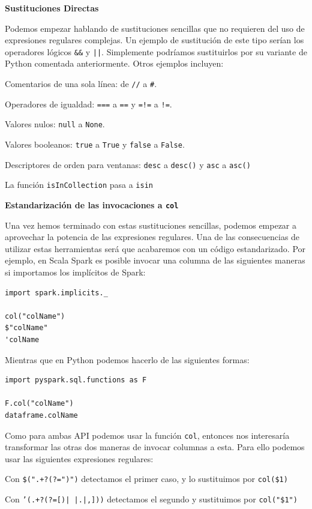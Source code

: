 \documentclass[12pt,twoside,titlepage]{report}
\begin{document}
\textbf{Sustituciones Directas}

Podemos empezar hablando de sustituciones sencillas que no requieren del uso de expresiones regulares complejas. Un ejemplo de sustitución de este tipo serían los operadores lógicos \texttt{\&\&} y \texttt{||}. Simplemente podríamos sustituirlos por su variante de Python comentada anteriormente. Otros ejemplos incluyen:

\begin{compactitem}
	\item Comentarios de una sola línea: de \texttt{//} a \texttt{\#}.
	\item Operadores de igualdad: \texttt{===} a \texttt{==} y \texttt{=!=} a \texttt{!=}.
	\item Valores nulos: \texttt{null} a \texttt{None}.
	\item Valores booleanos: \texttt{true} a \texttt{True} y \texttt{false} a \texttt{False}.
	\item Descriptores de orden para ventanas: \texttt{desc} a \texttt{desc()} y \texttt{asc} a \texttt{asc()}
	\item La función \texttt{isInCollection} pasa a \texttt{isin}
\end{compactitem}


\textbf{Estandarización de las invocaciones a \texttt{col}}

Una vez hemos terminado con estas sustituciones sencillas, podemos empezar a aprovechar la potencia de las expresiones regulares. Una de las consecuencias de utilizar estas herramientas será que acabaremos con un código estandarizado. Por ejemplo, en Scala Spark es posible invocar una columna de las siguientes maneras si importamos los implícitos de Spark:

\begin{lstlisting}
import spark.implicits._
	
col("colName")
$"colName"
'colName
\end{lstlisting}

Mientras que en Python podemos hacerlo de las siguientes formas:

\begin{lstlisting}
import pyspark.sql.functions as F

F.col("colName")
dataframe.colName
\end{lstlisting}

Como para ambas API podemos usar la función \texttt{col}, entonces nos interesaría transformar las otras dos maneras de invocar columnas a esta. Para ello podemos usar las siguientes expresiones regulares:
\begin{compactitem}
	\item Con \texttt{\$(".+?(?=")")} detectamos el primer caso, y lo sustituimos por \texttt{col(\$1)}
	\item Con \texttt{'(.+?(?=[)| |.|,]))} detectamos el segundo y sustituimos por \texttt{col("\$1")}
\end{compactitem}
\end{document}
